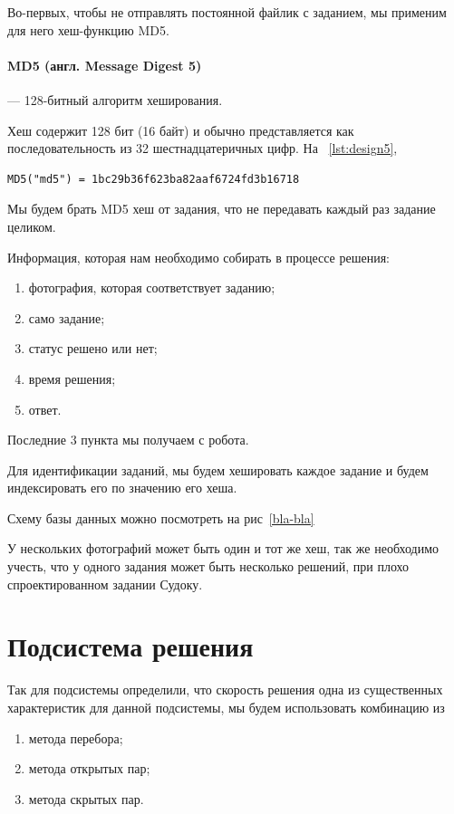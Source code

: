 Во-первых, чтобы не отправлять постоянной файлик с заданием, мы применим для него хеш-функцию MD5.

\paragraph{MD5 (англ. Message Digest 5)} — 128-битный алгоритм хеширования.

Хеш содержит 128 бит (16 байт) и обычно представляется как последовательность из 32 шестнадцатеричных цифр. На ~\ref{lst:design5},

\begin{lstlisting}[caption={Пример MD5 хеша}, label=lst:design5]
MD5("md5") = 1bc29b36f623ba82aaf6724fd3b16718
\end{lstlisting}

Мы будем брать MD5 хеш от задания, что не передавать каждый раз задание целиком.

Информация, которая нам необходимо собирать в процессе решения:
\begin{enumerate}
  \item фотография, которая соответствует заданию;
  \item само задание;
  \item статус решено или нет;
  \item время решения;
  \item ответ.
\end{enumerate}

Последние 3 пункта мы получаем с робота.

Для идентификации заданий, мы будем хешировать каждое задание и будем индексировать его по значению его хеша.

Схему базы данных можно посмотреть на рис~\ref{bla-bla}

У нескольких фотографий может быть один и тот же хеш, так же необходимо учесть, что у одного задания может быть несколько решений, при плохо спроектированном задании Судоку.

\section{Подсистема решения}

Так для подсистемы определили, что скорость решения одна из существенных характеристик для данной подсистемы, мы будем использовать комбинацию из 

\begin{enumerate}
  \item метода перебора;
  \item метода открытых пар;
  \item метода скрытых пар.
\end{enumerate}

